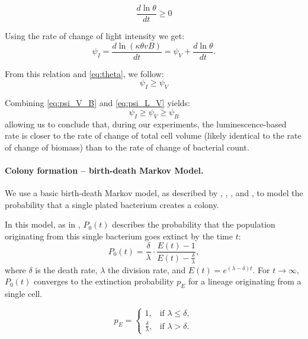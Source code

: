 \begin{equation}
  \frac{d\ln\theta}{dt} \geq 0 \label{eq:theta}
\end{equation}

Using the rate of change of light intensity we get:
\begin{equation}
  \psi_I = \frac{d\ln(\kappa\theta vB)}{dt} = \psi_V + \frac{d\ln\theta}{dt}.
\end{equation}

From this relation and \autoref{eq:theta}, we follow:
\begin{equation}
  \boxed{\psi_I \ge \psi_V} \label{eq:psi_L_V}
\end{equation}

Combining \autoref{eq:psi_V_B} and \autoref{eq:psi_L_V} yields:
\begin{equation}
  \boxed{\psi_I \ge \psi_V \ge \psi_B} \label{eq:I_V_B}
\end{equation}
allowing us to conclude that, during our experiments, the luminescence-based rate is closer to the rate of change of total cell volume (likely identical to the rate of change of biomass) than to the rate of change of bacterial count.

\paragraph{Colony formation -- birth-death Markov Model.\label{ssec:markov}}
We use a basic birth-death Markov model, as described by \cite{Coates2018}, \cite{Novozhilov2006}, \cite{Kendall1948}, and \cite{Feller1939}, to model the probability that a single plated bacterium creates a colony.

In this model, as in \cite{Coates2018}, $P_0(t)$ describes the probability that the population originating from this single bacterium goes extinct by the time $t$:
\begin{equation}
  P_0(t) = \frac{\delta}{\lambda} \cdot \frac{E(t) - 1}{E(t) - \frac{\delta}{\lambda}},
\end{equation}
where $\delta$ is the death rate, $\lambda$ the division rate, and $E(t) = e^{(\lambda - \delta)t}$.
For $t \to \infty$, $P_0(t)$ converges to the extinction probability $p_E$ for a lineage originating from a single cell.

\begin{equation}
  p_E =
  \begin{cases}
    1, & \text{if } \lambda \leq \delta, \\
    \frac{\delta}{\lambda}, & \text{if } \lambda > \delta.
  \end{cases}
\end{equation}

